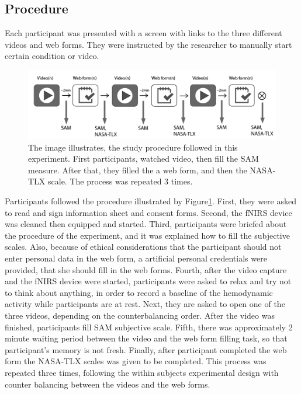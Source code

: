 \documentclass[../main/Feedback.tex]{subfiles}
\begin{document}
\subsection{Procedure}
Each participant was presented with a screen with links to the three different videos and web forms. They were instructed by the researcher to manually start certain condition or video.

\begin{figure}[h]
	\centering
	\includegraphics[width=0.8\linewidth]{../figures/study-procedure}
	\caption[study procedure]{The image illustrates, the study procedure followed in this experiment. First participants, watched video, then fill the SAM measure. After that, they filled the a web form, and then the NASA-TLX scale. The process was repeated 3 times.}
	\label{fig:study-procedure}
\end{figure}		
Participants followed the procedure illustrated by Figure\ref{fig:study-procedure}. First, they were asked to read and sign information sheet and consent forms. Second, the fNIRS device was cleaned then equipped and started. Third, participants were briefed about the procedure of the experiment, and it was explained how to fill the subjective scales. Also, because of ethical considerations that the participant should not enter personal data in the web form, a artificial personal credentials were provided, that she should fill in the web forms. Fourth, after the video capture and the fNIRS device were started, participants were asked to relax and try not to think about anything, in order to record a baseline of the hemodynamic activity while participants are at rest. Next, they are asked to open one of the three videos, depending on the counterbalancing order. After the video was finished, participants fill SAM subjective scale. Fifth, there was approximately 2 minute waiting period between the video and the web form filling task, so that participant's memory is not fresh. Finally, after participant completed the web form the NASA-TLX scales was given to be completed. This process was repeated three times, following the within subjects experimental design with counter balancing between the videos and the web forms.
\end{document}
